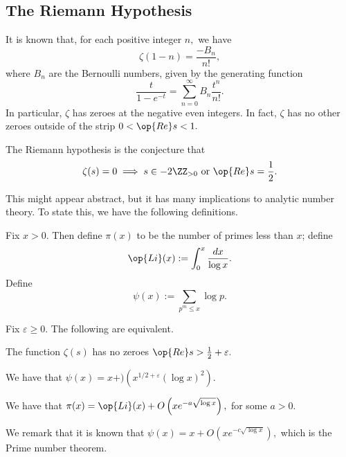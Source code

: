 \subsection{The Riemann Hypothesis}
It is known that, for each positive integer $n,$ we have
\[\zeta(1-n)=\frac{-B_n}{n!},\]
where $B_n$ are the Bernoulli numbers, given by the generating function
\[\frac{t}{1-e^{-t}}=\sum_{n=0}^\infty B_n\frac{t^n}{n!}.\]
In particular, $\zeta$ has zeroes at the negative even integers. In fact, $\zeta$ has no other zeroes outside of the strip $0<\op{Re}s<1.$ 
\begin{conj}
	The Riemann hypothesis is the conjecture that
	\[\zeta(s)=0\implies s\in-2\ZZ_{>0}\text{ or }\op{Re}s=\frac12.\]
\end{conj}
This might appear abstract, but it has many implications to analytic number theory. To state this, we have the following definitions.
\begin{definition}
	Fix $x>0.$ Then define $\pi(x)$ to be the number of primes less than $x$; define
	\[\op{Li}(x):=\int_0^x\frac{dx}{\log x}.\]
	Define
	\[\psi(x):=\sum_{p^m\le x}\log p.\]
\end{definition}
\begin{theorem}
	Fix $\varepsilon\ge0.$ The following are equivalent.
	\begin{listroman}
		\item The function $\zeta(s)$ has no zeroes $\op{Re}s>\frac12+\varepsilon.$
		\item We have that $\psi(x)=x+)\left(x^{1/2+\varepsilon}(\log x)^2\right).$
		\item We have that $\pi(x)=\op{Li}(x)+O\left(xe^{-a\sqrt{\log x}}\right),$ for some $a>0.$
	\end{listroman}
\end{theorem}
We remark that it is known that $\psi(x)=x+O\left(xe^{-c\sqrt{\log x}}\right),$ which is the Prime number theorem.


